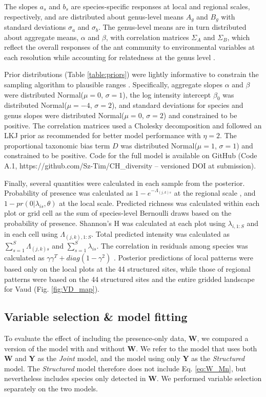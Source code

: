 \documentclass[preprint,final,times,12pt,3p]{elsarticle}
\begin{document}
The slopes $a_s$ and $b_s$ are species-specific responses at local and regional scales, respectively, and are distributed about genus-level means $A_g$ and $B_g$ with standard deviations $\sigma_a$ and $\sigma_b$. The genus-level means are in turn distributed about aggregate means, $\alpha$ and $\beta$, with correlation matrices $\Sigma_A$ and $\Sigma_B$, which reflect the overall responses of the ant community to environmental variables at each resolution while accounting for relatedness at the genus level \citep{Hadfield2010b,Ovaskainen2011,Szewczyk2018,Caradima2019}.

Prior distributions (Table \ref{table:priors}) were lightly informative to constrain the sampling algorithm to plausible ranges \citep{Carpenter2017,Lemoine2019}. Specifically, aggregate slopes $\alpha$ and $\beta$ were distributed Normal($\mu=0$, $\sigma=1$), the log intensity intercept $\beta_0$ was distributed Normal($\mu=-4$, $\sigma=2$), and standard deviations for species and genus slopes were distributed Normal($\mu=0$, $\sigma=2$) and constrained to be positive. The correlation matrices used a Cholesky decomposition and followed an LKJ prior as recommended for better model performance \citep{Carpenter2017,Caradima2019} with $\eta=2$. The proportional taxonomic bias term $D$ was distributed Normal($\mu=1$, $\sigma=1$) and constrained to be positive. Code for the full model is available on GitHub (Code A.1, https://github.com/Sz-Tim/CH\_diversity -- versioned DOI at submission).

Finally, several quantities were calculated in each sample from the posterior. Probability of presence was calculated as $1 - e^{-\Lambda_{(j,k)s}}$ at the regional scale \citep{Hefley2016}, and $1 - pr(0 | \lambda_{is}, \theta)$ at the local scale. Predicted richness was calculated within each plot or grid cell as the sum of species-level Bernoulli draws based on the probability of presence. Shannon's H was calculated at each plot using $\lambda_{i,1:S}$ and in each cell using $\Lambda_{(j,k),1:S}$. Total predicted intensity was calculated as $\sum_{s=1}^{S}\Lambda_{(j,k)s}$ and $\sum_{s=1}^{S}\lambda_{is}$. The correlation in residuals among species was calculated as $\gamma \gamma^T + diag(1 - \gamma^2)$ \citep{Tobler2019}. Posterior predictions of local patterns were based only on the local plots at the 44 structured sites, while those of regional patterns were based on the 44 structured sites and the entire gridded landscape for Vaud (Fig. \ref{fig:VD_map}). 


\subsection{Variable selection \& model fitting}
To evaluate the effect of including the presence-only data, \textbf{W}, we compared a version of the model with and without \textbf{W}. We refer to the model that uses both \textbf{W} and \textbf{Y} as the \emph{Joint} model, and the model using only \textbf{Y} as the \emph{Structured} model. The \emph{Structured} model therefore does not include Eq. \ref{eq:W_Mn}, but nevertheless includes species only detected in \textbf{W}. We performed variable selection separately on the two models.
\end{document}
